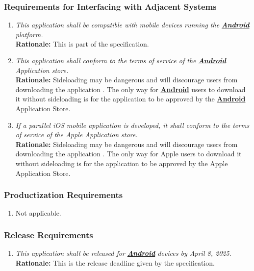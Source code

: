 \documentclass[]{article}
\begin{document}
\subsubsection{Requirements for Interfacing with Adjacent Systems}
\label{ssub:requirements_for_interfacing_with_adjacent_systems}
\begin{enumerate}[{OE-IA}1. ]
	\item \textit{This application shall be compatible with mobile devices running the \hyperref[Android]{\textbf{Android}} platform.} \\ \textbf{Rationale:} This is part of the specification.
    \item \textit{This application shall conform to the terms of service of the \hyperref[Android]{\textbf{Android}} Application store.} \\ \textbf{Rationale:} Sideloading may be dangerous and will discourage users from downloading the application \cite{Trio}. The only way for \hyperref[Android]{\textbf{Android}} users to download it without sideloading is for the application to be approved by the \hyperref[Android]{\textbf{Android}} Application Store.
    \item \textit{If a parallel iOS mobile application is developed, it shall conform to the terms of service of the Apple Application store.} \\ \textbf{Rationale:} Sideloading may be dangerous and will discourage users from downloading the application \cite{Trio}. The only way for Apple users to download it without sideloading is for the application to be approved by the Apple Application Store.
    
\end{enumerate}

\subsubsection{Productization Requirements}
\label{ssub:productization_requirements}
\begin{enumerate}[{OE-P}1. ]
	\item Not applicable.
\end{enumerate}

\subsubsection{Release Requirements}
\label{ssub:release_requirements}
\begin{enumerate}[{OE-R}1. ]
	\item \textit{This application shall be released for \hyperref[Android]{\textbf{Android}} devices by April 8, 2025.} \\ \textbf{Rationale:} This is the release deadline given by the specification.
\end{enumerate}
\end{document}
